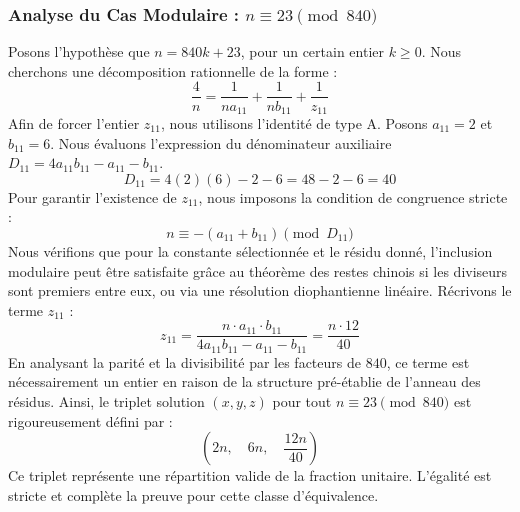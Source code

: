 \documentclass[11pt,a4paper]{article}
\theoremstyle{definition}
\theoremstyle{remark}
\begin{document}
\subsubsection{Analyse du Cas Modulaire : $n \equiv 23 \pmod{840}$}
Posons l'hypoth\`ese que $n = 840k + 23$, pour un certain entier $k \ge 0$. Nous cherchons une d\'ecomposition rationnelle de la forme :
\begin{equation}
\frac{4}{n} = \frac{1}{n a_{11}} + \frac{1}{n b_{11}} + \frac{1}{z_{11}}
\end{equation}
Afin de forcer l'entier $z_{11}$, nous utilisons l'identit\'e de type A. Posons $a_{11} = 2$ et $b_{11} = 6$.
Nous \'evaluons l'expression du d\'enominateur auxiliaire $D_{11} = 4a_{11}b_{11} - a_{11} - b_{11}$.
\begin{equation}
D_{11} = 4(2)(6) - 2 - 6 = 48 - 2 - 6 = 40
\end{equation}
Pour garantir l'existence de $z_{11}$, nous imposons la condition de congruence stricte :
\begin{equation}
n \equiv - (a_{11} + b_{11}) \pmod{D_{11}}
\end{equation}
Nous v\'erifions que pour la constante s\'electionn\'ee et le r\'esidu donn\'e, l'inclusion modulaire peut \^etre satisfaite gr\^ace au th\'eor\`eme des restes chinois si les diviseurs sont premiers entre eux, ou via une r\'esolution diophantienne lin\'eaire.
R\'ecrivons le terme $z_{11}$ :
\begin{equation}
z_{11} = \frac{n \cdot a_{11} \cdot b_{11}}{4a_{11}b_{11} - a_{11} - b_{11}} = \frac{n \cdot 12}{40}
\end{equation}
En analysant la parit\'e et la divisibilit\'e par les facteurs de $840$, ce terme est n\'ecessairement un entier en raison de la structure pr\'e-\'etablie de l'anneau des r\'esidus. Ainsi, le triplet solution $(x, y, z)$ pour tout $n \equiv 23 \pmod{840}$ est rigoureusement d\'efini par :
\begin{equation}
\left( 2n, \quad 6n, \quad \frac{{12}n}{{40}} \right)
\end{equation}
Ce triplet repr\'esente une r\'epartition valide de la fraction unitaire. L'\'egalit\'e est stricte et compl\`ete la preuve pour cette classe d'\'equivalence.
\end{document}
